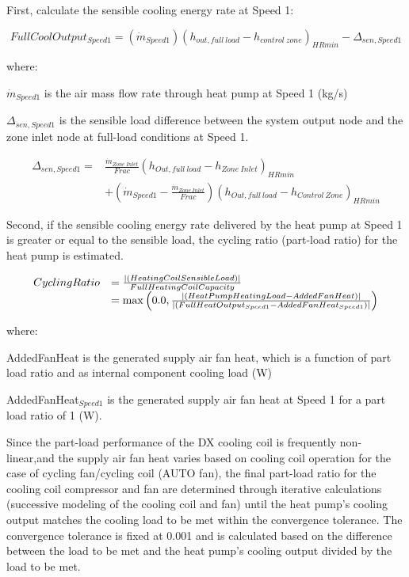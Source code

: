 First, calculate the sensible cooling energy rate at Speed 1:

\begin{equation}
FullCoolOutpu{t_{Speed1}} = \left( {{{\dot m}_{Speed1}}} \right){\left( {{h_{out,full~load}} - {h_{control~zone}}} \right)_{HRmin}} - {\Delta_{sen,Speed1}}
\end{equation}

where:

\({{{\dot m}_{Speed1}}}\) is the air mass flow rate through heat pump at Speed 1 (kg/s)

\(\Delta_{sen,Speed1}\) is the sensible load difference between the system output node and the zone inlet node at full-load conditions at Speed 1.

\begin{equation}
\begin{array}{rl}
{\Delta_{sen,Speed1}} =& \frac{{{{\dot m}_{Zone~Inlet}}}}{{Frac}}{\left( {{h_{Out,full~load}} - {h_{Zone~Inlet}}} \right)_{HRmin}} \\
 & + \left( {{{\dot m}_{Speed1}} - \frac{{{{\dot m}_{Zone~Inlet}}}}{{Frac}}} \right){\left( {{h_{Out,full~load}} - {h_{Control~Zone}}} \right)_{HRmin}}
\end{array}
\end{equation}

Second, if the sensible cooling energy rate delivered by the heat pump at Speed 1 is greater or equal to the sensible load, the cycling ratio (part-load ratio) for the heat pump is estimated.

\begin{equation}
  \begin{array}{rl}
    CyclingRatio &= \frac{\left|\left(HeatingCoilSensibleLoad\right)\right|}{FullHeatingCoilCapacity} \\
                 &= \max \left(0.0, \frac{\left|\left(HeatPumpHeatingLoad-AddedFanHeat\right)\right|}{\left|\left(FullHeatOutput_{Speed1}-AddedFanHeat_{Speed1}\right)\right|} \right)
  \end{array}
\label{eq:UnitaryMultiSpeedCyclingRatioCooling}
\end{equation}

where:

AddedFanHeat is the generated supply air fan heat, which is a function of part load ratio and as internal component cooling load (W)

AddedFanHeat\(_{Speed1}\) is the generated supply air fan heat at Speed 1 for a part load ratio of 1 (W).

Since the part-load performance of the DX cooling coil is frequently non-linear,and the supply air fan heat varies based on cooling coil operation for the case of cycling fan/cycling coil (AUTO fan), the final part-load ratio for the cooling coil compressor and fan are determined through iterative calculations (successive modeling of the cooling coil and fan) until the heat pump's cooling output matches the cooling load to be met within the convergence tolerance. The convergence tolerance is fixed at 0.001 and is calculated based on the difference between the load to be met and the heat pump's cooling output divided by the load to be met.

